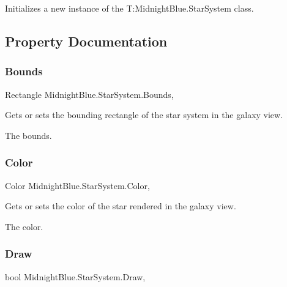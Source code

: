 Initializes a new instance of the T\+:\+Midnight\+Blue.\+Star\+System class. 



\subsection{Property Documentation}
\hypertarget{class_midnight_blue_1_1_star_system_ad850b29423ea1ae941e8d4f3e16b9283}{}\label{class_midnight_blue_1_1_star_system_ad850b29423ea1ae941e8d4f3e16b9283} 
\subsubsection{\texorpdfstring{Bounds}{Bounds}}
{\footnotesize\ttfamily Rectangle Midnight\+Blue.\+Star\+System.\+Bounds\hspace{0.3cm}{\ttfamily [get]}, {\ttfamily [set]}}



Gets or sets the bounding rectangle of the star system in the galaxy view. 

The bounds.\hypertarget{class_midnight_blue_1_1_star_system_a23bc9f35df49f8411cb72bc3385dd90b}{}\label{class_midnight_blue_1_1_star_system_a23bc9f35df49f8411cb72bc3385dd90b} 
\subsubsection{\texorpdfstring{Color}{Color}}
{\footnotesize\ttfamily Color Midnight\+Blue.\+Star\+System.\+Color\hspace{0.3cm}{\ttfamily [get]}, {\ttfamily [set]}}



Gets or sets the color of the star rendered in the galaxy view. 

The color.\hypertarget{class_midnight_blue_1_1_star_system_a9909c0e06a0fb6dc2dd657f00b61911a}{}\label{class_midnight_blue_1_1_star_system_a9909c0e06a0fb6dc2dd657f00b61911a} 
\subsubsection{\texorpdfstring{Draw}{Draw}}
{\footnotesize\ttfamily bool Midnight\+Blue.\+Star\+System.\+Draw\hspace{0.3cm}{\ttfamily [get]}, {\ttfamily [set]}}



